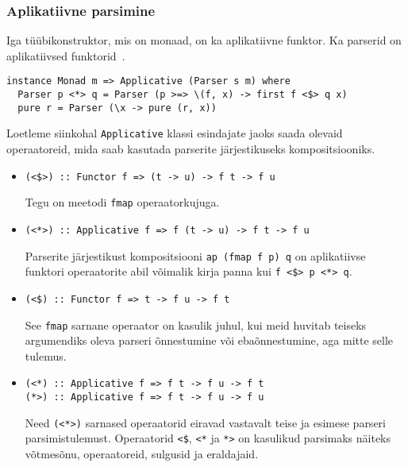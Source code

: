 \documentclass[12pt]{article}
\begin{document}
      \subsubsection{Aplikatiivne parsimine}\label{appars}
        Iga tüübikonstruktor, mis on monaad, on ka aplikatiivne funktor. Ka parserid on aplikatiivsed funktorid~\cite{App}.

        \begin{verbatim}instance Monad m => Applicative (Parser s m) where
  Parser p <*> q = Parser (p >=> \(f, x) -> first f <$> q x)
  pure r = Parser (\x -> pure (r, x))\end{verbatim}

        Loetleme siinkohal \verb!Applicative! klassi esindajate jaoks saada olevaid operaatoreid, mida saab kasutada parserite järjestikuseks kompositsiooniks.

        \begin{itemize}
          \item
            \begin{verbatim}(<$>) :: Functor f => (t -> u) -> f t -> f u\end{verbatim}

            Tegu on meetodi \verb!fmap! operaatorkujuga.
          \item
            \begin{verbatim}(<*>) :: Applicative f => f (t -> u) -> f t -> f u\end{verbatim}

            Parserite järjestikust kompositsiooni \verb!ap (fmap f p) q! on aplikatiivse funktori operaatorite abil võimalik kirja panna kui \verb!f <$> p <*> q!.
          \item
            \begin{verbatim}(<$) :: Functor f => t -> f u -> f t\end{verbatim}

            See \verb!fmap! sarnane operaator on kasulik juhul, kui meid huvitab teiseks argumendiks oleva parseri õnnestumine või ebaõnnestumine, aga mitte selle tulemus.
          \item
            \begin{verbatim}(<*) :: Applicative f => f t -> f u -> f t
(*>) :: Applicative f => f t -> f u -> f u\end{verbatim}

            Need \verb!(<*>)! sarnased operaatorid eiravad vastavalt teise ja esimese parseri parsimistulemust. Operaatorid \verb!<$!, \verb!<*! ja \verb!*>! on kasulikud parsimaks näiteks võtmesõnu, operaatoreid, sulgusid ja eraldajaid.
        \end{itemize}
\end{document}
